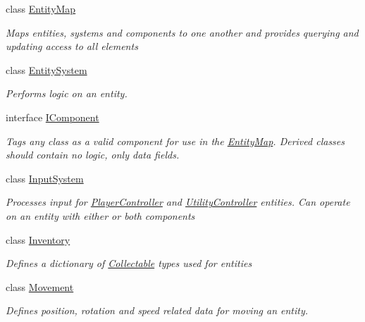 \begin{DoxyCompactItemize}
class \hyperlink{class_m_b2_d_1_1_entity_component_1_1_entity_map}{Entity\+Map}
\begin{DoxyCompactList}\small\item\em Maps entities, systems and components to one another and provides querying and updating access to all elements \end{DoxyCompactList}\item 
class \hyperlink{class_m_b2_d_1_1_entity_component_1_1_entity_system}{Entity\+System}
\begin{DoxyCompactList}\small\item\em Performs logic on an entity. \end{DoxyCompactList}\item 
interface \hyperlink{interface_m_b2_d_1_1_entity_component_1_1_i_component}{I\+Component}
\begin{DoxyCompactList}\small\item\em Tags any class as a valid component for use in the \hyperlink{class_m_b2_d_1_1_entity_component_1_1_entity_map}{Entity\+Map}. Derived classes should contain no logic, only data fields. \end{DoxyCompactList}\item 
class \hyperlink{class_m_b2_d_1_1_entity_component_1_1_input_system}{Input\+System}
\begin{DoxyCompactList}\small\item\em Processes input for \hyperlink{class_m_b2_d_1_1_entity_component_1_1_player_controller}{Player\+Controller} and \hyperlink{class_m_b2_d_1_1_entity_component_1_1_utility_controller}{Utility\+Controller} entities. Can operate on an entity with either or both components \end{DoxyCompactList}\item 
class \hyperlink{class_m_b2_d_1_1_entity_component_1_1_inventory}{Inventory}
\begin{DoxyCompactList}\small\item\em Defines a dictionary of \hyperlink{class_m_b2_d_1_1_collectable}{Collectable} types used for entities \end{DoxyCompactList}\item 
class \hyperlink{class_m_b2_d_1_1_entity_component_1_1_movement}{Movement}
\begin{DoxyCompactList}\small\item\em Defines position, rotation and speed related data for moving an entity. \end{DoxyCompactList}\item 

\end{DoxyCompactItemize}

